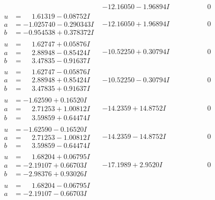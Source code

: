 \documentclass[1p]{elsarticle_modified}
\theoremstyle{definition}
\begin{document}
$$\begin{array}{c|c|c}
 & -12.16050 - 1.96894 I & \phantom{-0.000000 } 0 \\ \hline\begin{aligned}
u &= \phantom{-}1.61319 - 0.08752 I \\
a &= -1.025740 - 0.290343 I \\
b &= -0.954538 + 0.378372 I\end{aligned}
 & -12.16050 + 1.96894 I & \phantom{-0.000000 } 0 \\ \hline\begin{aligned}
u &= \phantom{-}1.62747 + 0.05876 I \\
a &= \phantom{-}2.88948 - 0.85424 I \\
b &= \phantom{-}3.47835 - 0.91637 I\end{aligned}
 & -10.52250 + 0.30794 I & \phantom{-0.000000 } 0 \\ \hline\begin{aligned}
u &= \phantom{-}1.62747 - 0.05876 I \\
a &= \phantom{-}2.88948 + 0.85424 I \\
b &= \phantom{-}3.47835 + 0.91637 I\end{aligned}
 & -10.52250 - 0.30794 I & \phantom{-0.000000 } 0 \\ \hline\begin{aligned}
u &= -1.62590 + 0.16520 I \\
a &= \phantom{-}2.71253 + 1.00812 I \\
b &= \phantom{-}3.59859 + 0.64474 I\end{aligned}
 & -14.2359 + 14.8752 I & \phantom{-0.000000 } 0 \\ \hline\begin{aligned}
u &= -1.62590 - 0.16520 I \\
a &= \phantom{-}2.71253 - 1.00812 I \\
b &= \phantom{-}3.59859 - 0.64474 I\end{aligned}
 & -14.2359 - 14.8752 I & \phantom{-0.000000 } 0 \\ \hline\begin{aligned}
u &= \phantom{-}1.68204 + 0.06795 I \\
a &= -2.19107 + 0.66703 I \\
b &= -2.98376 + 0.93026 I\end{aligned}
 & -17.1989 + 2.9520 I & \phantom{-0.000000 } 0 \\ \hline\begin{aligned}
u &= \phantom{-}1.68204 - 0.06795 I \\
a &= -2.19107 - 0.66703 I \\

\end{aligned}
\end{array}$$
\end{document}
